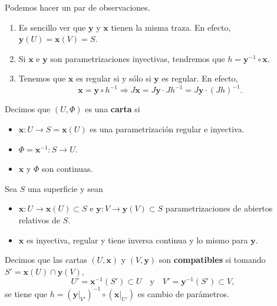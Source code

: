 \begin{observation} Podemos hacer un par de observaciones.
	\begin{enumerate}
	\item Es sencillo ver que $\displaystyle \textbf{y}  $ y $\displaystyle \textbf{x}  $ tienen la misma traza. En efecto, $\displaystyle \textbf{y} \left(U\right)= \textbf{x} \left(V\right)=S $. 
	\item Si $\displaystyle \textbf{x}  $ e $\displaystyle \textbf{y}  $ son parametrizaciones inyectivas, tendremos que $\displaystyle h = \textbf{y} ^{-1}\circ \textbf{x}  $. 
	\item Tenemos que $\displaystyle \textbf{x}  $ es regular si y sólo si $\displaystyle \textbf{y}  $ es regular. En efecto, 
		\[ \textbf{x} = \textbf{y} \circ h^{-1} \Rightarrow J \textbf{x}  = J \textbf{y} \cdot  Jh^{-1} = J \textbf{y} \cdot  \left(Jh\right)^{-1} .\]
	\end{enumerate}
\end{observation}
\begin{definition}[Carta]
Decimos que  $\displaystyle \left(U, \Phi\right) $ es una \textbf{carta} si
\begin{itemize}
\item $\displaystyle \textbf{x} : U \to S = \textbf{x} \left(U\right) $ es una parametrización regular e inyectiva.
\item $\displaystyle \Phi = \textbf{x} ^{-1} : S \to U $.
\item $\displaystyle \textbf{x}  $ y $\displaystyle \Phi $ son continuas.
\end{itemize}
\end{definition}
\begin{definition}
Sea $\displaystyle S $ una superficie y sean 
\begin{itemize}
\item $\displaystyle \textbf{x} : U \to \textbf{x} \left(U\right)\subset S $ e $\displaystyle \textbf{y}  : V \to \textbf{y} \left(V\right)\subset S $ parametrizaciones de abiertos relativos de $\displaystyle S $.
\item $\displaystyle \textbf{x}  $ es inyectiva, regular y tiene inversa continua y lo mismo para $\displaystyle \textbf{y}  $.
\end{itemize}
 Decimos que las cartas $\displaystyle \left(U, \textbf{x} \right) $ y $\displaystyle \left(V, \textbf{y} \right) $ son \textbf{compatibles} si tomando $\displaystyle S' = \textbf{x} \left(U\right) \cap \textbf{y} \left(V\right) $, 
\[ U'= \textbf{x} ^{-1}\left(S'\right)\subset U \quad \text{y} \quad V' = \textbf{y} ^{-1}\left(S'\right)\subset V ,	\]
se tiene que $\displaystyle h = \left( \textbf{y} |_{V'}\right)^{-1} \circ \left( \textbf{x} |_{U'}\right) $ es cambio de parámetros.
\end{definition}
